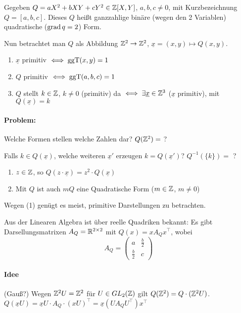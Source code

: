 \documentclass[a4paper,twoside,DIV15,BCOR12mm]{scrbook}
\begin{document}
Gegeben $Q=aX^2+bXY+cY^2 \in \mathbb{Z}[X,Y]$, $a,b,c \ne 0$, mit Kurzbezeichnung $Q=[a,b,c]$. Dieses $Q$ heißt ganzzahlige binäre (wegen den 2 Variablen) quadratische ($\mathop{\mathrm{grad}}\nolimits q=2$) Form.

Nun betrachtet man $Q$ als Abbildung $\mathbb{Z}^2 \to \mathbb{Z}^2$, $\underline x = (x,y) \mapsto Q(x,y)$.

\begin{definition}
\begin{enumerate}
\item $\underline x$ primitiv $\iff \mathop{\rm ggT}\nolimits(x,y)=1$
\item $Q$ primitiv $\iff \mathop{\rm ggT}\nolimits(a,b,c) = 1$
\item $Q$ stellt $k\in\mathbb{Z}$, $k\ne 0$ (primitiv) da $\iff \exists \underline x \in \mathbb{Z}^3$ ($\underline x$ primitiv), mit $Q(\underline x) = k$
\end{enumerate}
\end{definition}

\paragraph{Problem:} Welche Formen stellen welche Zahlen dar? $Q(\mathbb{Z}^2) =$ ?

Falls $k\in Q(\underline x)$, welche weiteren $\underline x'$ erzeugen $k=Q(\underline x')$? $Q^{-1}(\{k\})=$ ?

\begin{bemerkung}
\begin{enumerate}
\item $z\in\mathbb{Z}$, so $Q(z\cdot \underline x)= z^2 \cdot Q(\underline x)$
\item Mit $Q$ ist auch $mQ$ eine Quadratische Form ($m\in\mathbb{Z}$, $m\ne 0$)
\end{enumerate}
Wegen (1) genügt es meist, primitive Darstellungen zu betrachten.
\end{bemerkung}

Aus der Linearen Algebra ist über reelle Quadriken bekannt: Es gibt Darsellungsmatrixen $A_Q = \mathbb{R}^{2\times 2}$ mit $Q(x) = xA_Q x^\top$, wobei 
\[ A_Q = \begin{pmatrix} a & \frac b 2 \\ \frac b 2 & c \end{pmatrix}\]

\paragraph{Idee} (Gauß?) Wegen $\mathbb{Z}^2 U = \mathbb{Z}^2$ für $U\in GL_2(\mathbb{Z})$ gilt $Q(\mathbb{Z}^2) = Q\cdot (\mathbb{Z}^2 U)$. $Q(\underline xU) = \underline xU \cdot A_Q \cdot (x U)^\top = \underline x (U A_Q U^\top) x^\top$
\end{document}
